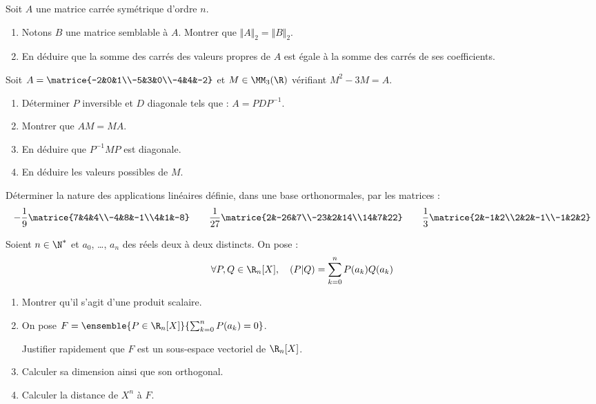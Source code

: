 \documentclass[french,11pt,twoside]{VcCours}
\begin{document}
\begin{Exercice}
  Soit $A$ une matrice carrée symétrique d’ordre $n$.
  \begin{enumerate}
    \item Notons $B$ une matrice semblable à $A$. Montrer que $\Vert A\Vert_2=\Vert B\Vert_2$.
    \item En déduire que la somme des carrés des valeurs propres de $A$ est égale à la somme des carrés de ses coefficients.
  \end{enumerate}
\end{Exercice}


\begin{Exercice}
  Soit $A=\matrice{-2&0&1\\-5&3&0\\-4&4&-2}$ et $M\in\MM_3(\R)$ vérifiant $M^2-3M=A$.
\begin{enumerate}
\item Déterminer $P$ inversible et $D$ diagonale tels que : $A = PDP^{-1}$.
\item Montrer que $AM = MA$.
\item En déduire que $P^{-1}MP$ est diagonale.
\item En déduire les valeurs possibles de $M$.
\end{enumerate}
\end{Exercice}


\begin{Exercice}
  Déterminer la nature des applications linéaires définie, dans une base orthonormales, par les matrices :
\[
  -\frac19\matrice{7&4&4\\-4&8&-1\\4&1&-8}
  \qquad  
  \frac1{27}\matrice{2&-26&7\\-23&2&14\\14&7&22}
  \qquad  
  \frac13\matrice{2&-1&2\\2&2&-1\\-1&2&2}
\]
\end{Exercice}


\begin{Exercice}
  Soient $n\in\N^*$ et $a_0$, \ldots, $a_n$ des réels deux à deux distincts. On pose :
\[\forall P,Q\in\R_n[X],\quad (P|Q) = \sum_{k=0}^nP(a_k)Q(a_k)\]
\begin{enumerate}
  \item Montrer qu’il s’agit d’une produit scalaire.
  \item On pose $F=\ensemble{P\in\R_n[X]}{\sum_{k=0}^nP(a_k)=0}$.
  
  Justifier rapidement que $F$ est un sous-espace vectoriel de $\R_n[X]$.
  \item Calculer sa dimension ainsi que son orthogonal.
  \item Calculer la distance de $X^n$ à $F$.
\end{enumerate}
\end{Exercice}
\end{document}
